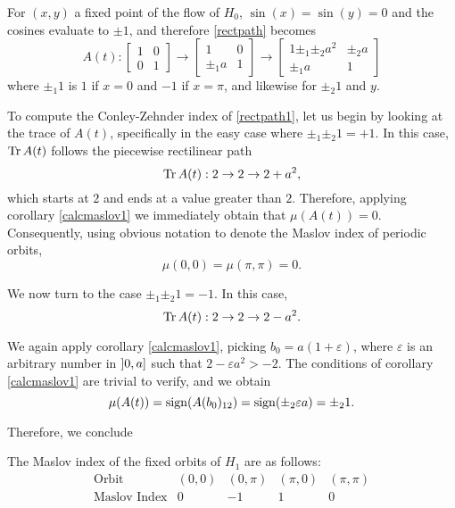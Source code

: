 For $(x,y)$ a fixed point of the flow of $H_0$, $\sin(x) = \sin(y) = 0$ and the cosines evaluate to $\pm 1$, and therefore \ref{rectpath} becomes
\begin{equation}\label{rectpath1}
A(t):
\begin{bmatrix}
1 & 0\\
0 & 1
\end{bmatrix}
\to
\begin{bmatrix}
1 & 0\\
\pm_1 a & 1
\end{bmatrix}
\to
\begin{bmatrix}
1 \pm_1 \pm_2 a^2 &  \pm_2 a\\
\pm_1 a & 1
\end{bmatrix}
\end{equation}
where $\pm_1 1$ is $1$ if $x=0$ and $-1$ if $x = \pi$, and likewise for $\pm_2 1$ and $y$.

To compute the Conley-Zehnder index of \eqref{rectpath1}, let us begin by looking at the trace of $A(t)$, specifically in the easy case where $\pm_1 \pm_2 1 = +1$. In this case, $\operatorname{Tr} A(t)$ follows the piecewise rectilinear path
\begin{equation}
\operatorname{Tr} A(t) : 2 \to 2 \to 2 + a^2,
\end{equation}
which starts at $2$ and ends at a value greater than $2$. Therefore, applying corollary \ref{calcmaslov1} we immediately obtain that $\mu(A(t)) = 0$. Consequently, using obvious notation to denote the Maslov index of periodic orbits,
\begin{equation}
\mu(0,0) = \mu(\pi,\pi) = 0.
\end{equation}

We now turn to the case $\pm_1 \pm_2 1 = -1$. In this case,
\begin{equation}
\operatorname{Tr} A(t) : 2 \to 2 \to 2 - a^2.
\end{equation}

We again apply corollary \ref{calcmaslov1}, picking $b_0 = a(1 + \varepsilon)$, where $\varepsilon$ is an arbitrary number in $\linterval 0 a$ such that $2 - \varepsilon a^2 > -2$. The conditions of corollary \ref{calcmaslov1} are trivial to verify, and we obtain
\begin{equation}
\mu(A(t)) = \operatorname{sign}(A(b_0)_{12}) = \operatorname{sign}(\pm_2 \varepsilon a) = \pm_2 1.
\end{equation}

Therefore, we conclude
\begin{prop}
The Maslov index of the fixed orbits of $H_1$ are as follows:
\begin{equation}
\begin{array}{c|c|c|c|c}
\text{Orbit} & (0,0) & (0,\pi) & (\pi,0) & (\pi,\pi)\\
\hline
\text{Maslov Index} & 0 & -1 & 1 & 0
\end{array}
\end{equation}
\end{prop}

